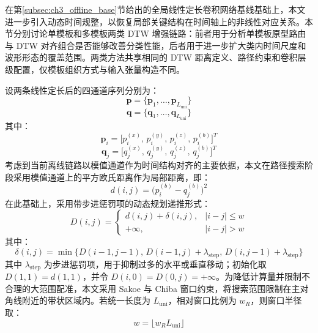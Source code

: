 \documentclass{xdupgthesis}
\begin{document}
在第\ref{subsec:ch3_offline_base}节给出的全局线性定长卷积网络基线基础上，本文进一步引入动态时间规整，以恢复局部关键结构在时间轴上的非线性对应关系\cite{ch3_sakoe1978dtw}。本节分别讨论单模板和多模板两类 DTW 增强链路：前者用于分析单模板原型路由与 DTW 对齐组合是否能够改善分类性能，后者用于进一步扩大类内时间尺度和波形形态的覆盖范围。两类方法共享相同的 DTW 距离定义、路径约束和卷积层级配置，仅模板组织方式与输入张量构造不同。

设两条线性定长后的四通道序列分别为：
\begin{equation}
    \mathbf{p}=\{\mathbf{p}_1,\ldots,\mathbf{p}_{L_{\mathrm{uni}}}\}
\end{equation}
\begin{equation}
    \mathbf{q}=\{\mathbf{q}_1,\ldots,\mathbf{q}_{L_{\mathrm{uni}}}\}
\end{equation}
其中：
\begin{equation}
    \mathbf{p}_i=\big[p_i^{(x)},\,p_i^{(y)},\,p_i^{(z)},\,p_i^{(b)}\big]^T
\end{equation}
\begin{equation}
    \mathbf{q}_j=\big[q_j^{(x)},\,q_j^{(y)},\,q_j^{(z)},\,q_j^{(b)}\big]^T
\end{equation}
考虑到当前离线链路以模值通道作为时间结构对齐的主要依据，本文在路径搜索阶段采用模值通道上的平方欧氏距离作为局部距离，即：
\begin{equation}
    d(i,j)=\big(p_i^{(b)}-q_j^{(b)}\big)^2
\end{equation}
在此基础上，采用带步进惩罚项的动态规划递推形式：
\begin{equation}
    D(i,j)=
    \begin{cases}
        d(i,j)+\delta(i,j), & |i-j|\le w\\
        +\infty, & |i-j|>w
    \end{cases}
\end{equation}
其中：
\begin{equation}
    \delta(i,j)=\min\big\{D(i-1,j-1),\,D(i-1,j)+\lambda_{\mathrm{step}},\,D(i,j-1)+\lambda_{\mathrm{step}}\big\}
\end{equation}
其中 $\lambda_{\mathrm{step}}$ 为步进惩罚项，用于抑制过多的水平或垂直移动；初始化取 $D(1,1)=d(1,1)$，并令 $D(i,0)=D(0,j)=+\infty$。为降低计算量并限制不合理的大范围配准，本文采用 Sakoe 与 Chiba 窗口约束，将搜索范围限制在主对角线附近的带状区域内。若统一长度为 $L_{\mathrm{uni}}$，相对窗口比例为 $w_R$，则窗口半径取：
\begin{equation}
    w=\lfloor w_R L_{\mathrm{uni}} \rfloor
\end{equation}
\end{document}
